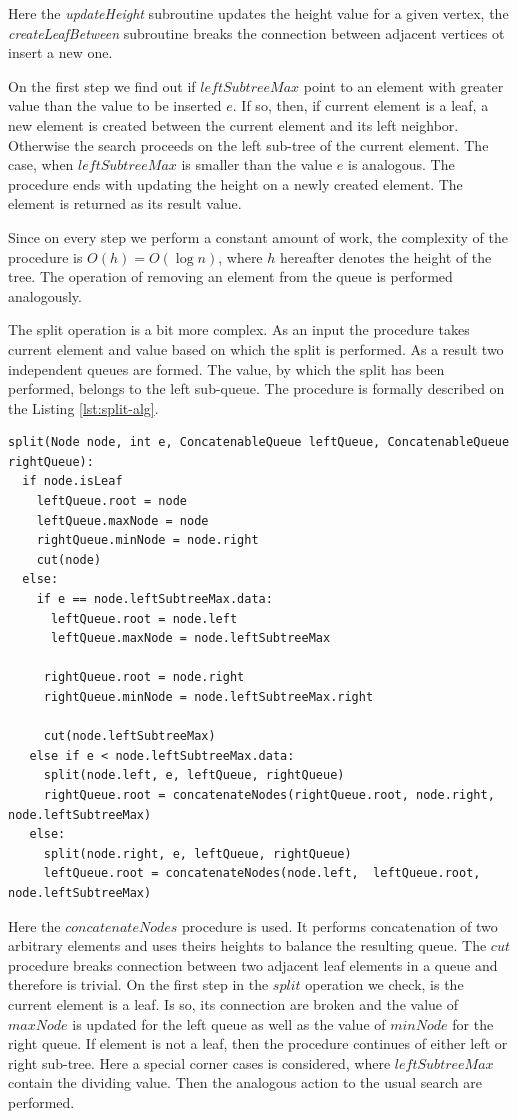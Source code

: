 \documentclass[sigconf]{acmart}
\begin{document}
		Here the \textit{updateHeight} subroutine updates the height value for a given vertex, the \textit{createLeafBetween} subroutine breaks the connection between adjacent vertices ot insert a new one.
		
		On the first step we find out if $leftSubtreeMax$ point to an element with greater value than the value to be inserted $e$. If so, then, if current element is a leaf, a new element is created between the current element and its left neighbor. Otherwise the search proceeds on the left sub-tree of the current element. The case, when $leftSubtreeMax$ is smaller than the value $e$ is analogous. The procedure ends with updating the height on a newly created element. The element is returned as its result value.
		
		Since on every step we perform a constant amount of work, the complexity of the procedure is $O(h)=O(\log n)$, where $h$ hereafter denotes the height of the tree. The operation of removing an element from the queue is performed analogously. 
		
		The split operation is a bit more complex. As an input the procedure takes current element and value based on which the split is performed. As a result two independent queues are formed. The value, by which the split has been performed, belongs to the left sub-queue. The procedure is formally described on the Listing \ref{lst:split-alg}.
		
		\begin{lstlisting}[caption={Queue split algorithm},label={lst:split-alg},captionpos=b]
split(Node node, int e, ConcatenableQueue leftQueue, ConcatenableQueue rightQueue): 
  if node.isLeaf
    leftQueue.root = node
    leftQueue.maxNode = node	
    rightQueue.minNode = node.right	
    cut(node)
  else:
    if e == node.leftSubtreeMax.data:
      leftQueue.root = node.left
      leftQueue.maxNode = node.leftSubtreeMax
  	  
     rightQueue.root = node.right
     rightQueue.minNode = node.leftSubtreeMax.right
  	  
     cut(node.leftSubtreeMax)
   else if e < node.leftSubtreeMax.data:
     split(node.left, e, leftQueue, rightQueue)
     rightQueue.root = concatenateNodes(rightQueue.root, node.right, node.leftSubtreeMax)
   else:
     split(node.right, e, leftQueue, rightQueue)
     leftQueue.root = concatenateNodes(node.left,  leftQueue.root, node.leftSubtreeMax)
		\end{lstlisting}
		
		Here the $concatenateNodes$ procedure is used. It performs concatenation of two arbitrary elements and uses theirs heights to balance the resulting queue. The $cut$ procedure breaks connection between two adjacent leaf elements in a queue and therefore is trivial. On the first step in the $split$ operation we check, is the current element is a leaf. Is so, its connection are broken and the value of $maxNode$ is updated for the left queue as well as the value of $minNode$ for the right queue. If element is not a leaf, then the procedure continues of either left or right sub-tree. Here a special corner cases is considered, where $leftSubtreeMax$ contain the dividing value. Then the analogous action to the usual search are performed.
		
\end{document}
